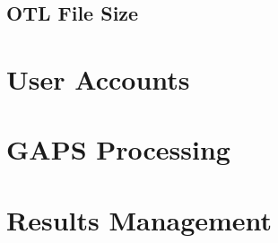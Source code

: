 \documentclass{report}
\begin{document}
\section{OTL File Size}
\par 


\chapter{User Accounts}


\chapter{GAPS Processing}


\chapter{Results Management}
\end{document}
